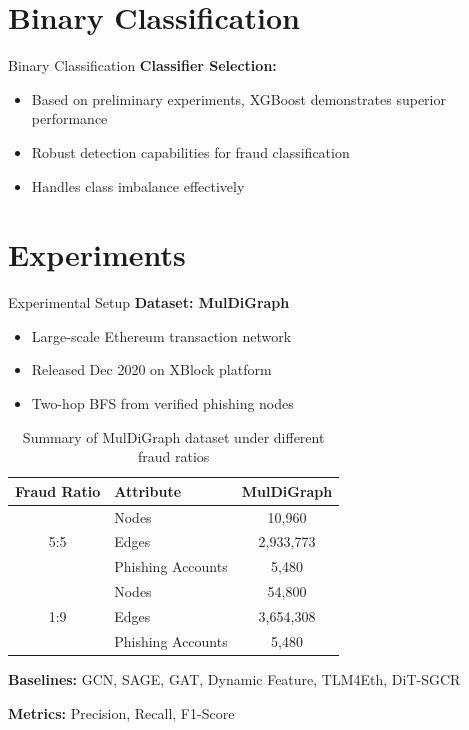\documentclass{beamer}
\begin{document}
\section{Binary Classification}

\begin{frame}{Binary Classification}
    \textbf{Classifier Selection:}
    \begin{itemize}
        \item Based on preliminary experiments, XGBoost demonstrates superior performance
        \item Robust detection capabilities for fraud classification
        \item Handles class imbalance effectively
    \end{itemize}
\end{frame}

\section{Experiments}

\begin{frame}{Experimental Setup}
    \textbf{Dataset: MulDiGraph}
    \begin{itemize}
        \item Large-scale Ethereum transaction network
        \item Released Dec 2020 on XBlock platform
        \item Two-hop BFS from verified phishing nodes
    \end{itemize}
    
    \begin{table}
        \centering
        \scriptsize
        \caption{Summary of MulDiGraph dataset under different fraud ratios}
        \begin{tabular}{c l c}
            \hline
            \textbf{Fraud Ratio} & \textbf{Attribute} & \textbf{MulDiGraph} \\
            \hline
            \multirow{3}{*}{5:5} & Nodes & 10,960 \\
             & Edges & 2,933,773  \\
             & Phishing Accounts & 5,480 \\
            \hline
            \multirow{3}{*}{1:9} & Nodes & 54,800 \\
             & Edges &  3,654,308 \\
             & Phishing Accounts & 5,480 \\
            \hline
        \end{tabular}
    \end{table}
    
    \textbf{Baselines:} GCN, SAGE, GAT, Dynamic Feature, TLM4Eth, DiT-SGCR
    
    \textbf{Metrics:} Precision, Recall, F1-Score
\end{frame}
\end{document}
